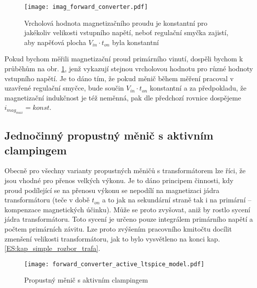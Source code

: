     \begin{figure}[ht!]
    \centering
    \texttt{[image: imag\_forward\_converter.pdf]}
    \caption[Magnetizační proud]{Vrcholová hodnota magnetizačního proudu je konstantní pro
             jakékoliv velikosti vstupního napětí, neboť regulační smyčka zajistí, aby napěťová
             plocha $V_{in}\cdot t_{on}$ byla konstantní}
    \label{enz:fig_imag_forward_converter}
    \end{figure}
    
    Pokud bychom měřili magnetizační proud primárního vinutí, dospěli bychom k průběhům na obr.
    \ref{enz:fig_imag_forward_converter}, jenž vykazují stejnou vrcholovou hodnotu pro různé 
    hodnoty vstupního napětí. Je to dáno tím, že pokud měnič během měření pracoval v uzavřené 
    regulační smyčce, bude součin $V_{in}\cdot t_{on}$ konstantní a za předpokladu, že 
    magnetizační indukčnost je též neměnná, pak dle předchozí rovnice dospějeme $i_{mag_{max}} = 
    konst$.
   
  \subsection{Jednočinný propustný měnič s aktivním clampingem}\label{ENZ:kap_afwdconv}  
    Obecně pro všechny varianty  propustných měničů s transformátorem lze říci, že jsou vhodné pro
    přenos velkých výkonu. Je to dáno principem činnosti, kdy proud podílející se na přenosu 
    výkonu se nepodílí na magnetizaci jádra transformátoru (teče v době $t_{on}$ a to jak na 
    sekundární straně tak i na primární – kompenzace magnetických účinku). Může se proto 
    zvyšovat, aniž by rostlo sycení jádra transformátoru. Toto sycení je určeno pouze integrálem 
    primárního napětí a počtem primárních závitu. Lze proto zvýšením pracovního kmitočtu docílit 
    zmenšení velikosti transformátoru, jak to bylo vysvětleno na konci kap. 
    \ref{ES:kap_simple_rozbor_trafa}.
    \begin{figure}[ht!]
      \centering
      \texttt{[image: forward\_converter\_active\_ltspice\_model.pdf]}
      \caption[Propustný měnič s aktivním clampingem]{Propustný měnič s aktivním clampingem}
      \label{enz:fig_imag_a_lt_frwd_conv}
    \end{figure}   


